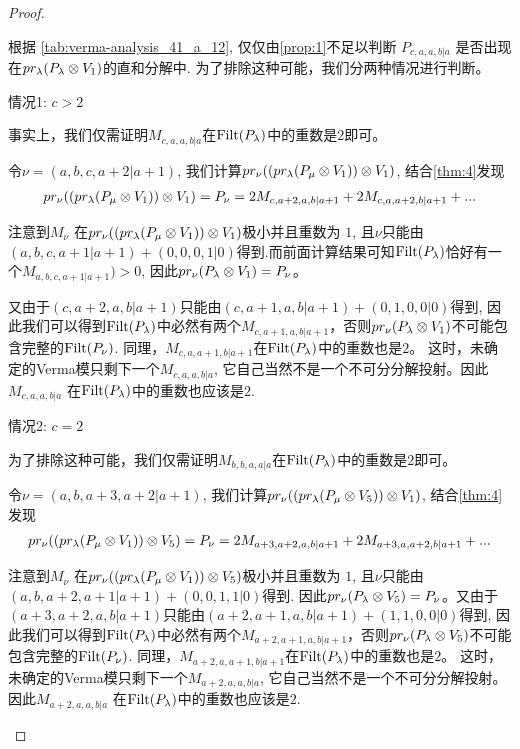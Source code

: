 \begin{proof}
\begin{enumerate}
\begin{enumerate}
\begin{enumerate}
根据 \cref{tab:verma-analysis_41_a_12}, 仅仅由\cref{prop:1}不足以判断 $P_{c,a,a,b|a}$ 是否出现在$pr_\lambda(P_\lambda \otimes V_{1})$的直和分解中. 为了排除这种可能，我们分两种情况进行判断。

情况1: $c>2$

事实上，我们仅需证明$M_{c,a,a,b|a}$在$\operatorname{Filt}(P_{\lambda})$中的重数是$2$即可。

令$\nu = (a,b,c,a+2|a+1)$, 我们计算$pr_\nu ( ( pr_\lambda(P_\mu \otimes V_{1}) ) \otimes V_1 )$, 结合\cref{thm:4}发现
\begin{equation}\notag
  \begin{aligned}
  pr_\nu ( ( pr_\lambda(P_\mu \otimes V_{1}) ) \otimes V_1 ) =
  P_\nu = 2M_{c,a+2,a,b|a+1} + 2M_{c,a,a+2,b|a+1} + ...
  \end{aligned}
\end{equation}

注意到$M_\nu$ 在$pr_\nu ( ( pr_\lambda(P_\mu \otimes V_{1}) ) \otimes V_1 )$极小并且重数为 $1$, 且$\nu$只能由$ (a,b,c,a+1|a+1) + (0,0,0,1|0)$得到.而前面计算结果可知$\operatorname{Filt}(P_\lambda)$恰好有一个$M_{a,b,c,a+1|a+1})>0$, 因此$pr_\nu(P_\lambda \otimes V_1) = P_\nu$。

又由于$(c,a+2,a,b|a+1)$只能由$(c,a+1,a,b|a+1) + (0,1,0,0|0)$得到, 因此我们可以得到$\operatorname{Filt}(P_{\lambda})$中必然有两个$M_{c,a+1,a,b|a+1}$，否则$pr_\nu(P_\lambda \otimes V_1)$不可能包含完整的$\operatorname{Filt}(P_\nu)$. 同理，$M_{c,a,a+1,b|a+1}$在$\operatorname{Filt}(P_{\lambda})$中的重数也是$2$。
这时，未确定的Verma模只剩下一个$M_{c,a,a,b|a}$, 它自己当然不是一个不可分分解投射。因此$M_{c,a,a,b|a}$ 在$\operatorname{Filt}(P_\lambda)$中的重数也应该是$2$.


情况2: $c=2$

为了排除这种可能，我们仅需证明$M_{b,b,a,a|a}$在$\operatorname{Filt}(P_{\lambda})$中的重数是$2$即可。

令$\nu = (a,b,a+3,a+2|a+1)$, 我们计算$pr_\nu ( ( pr_\lambda(P_\mu \otimes V_{5}) ) \otimes V_1 )$, 结合\cref{thm:4}发现
\begin{equation}\notag
  \begin{aligned}
  pr_\nu ( ( pr_\lambda(P_\mu \otimes V_{1}) ) \otimes V_5 ) =
  P_\nu = 2M_{a+3,a+2,a,b|a+1}+ 2M_{a+3,a,a+2,b|a+1}+...
  \end{aligned}
\end{equation}

注意到$M_\nu$ 在$pr_\nu ( ( pr_\lambda(P_\mu \otimes V_{1}) ) \otimes V_5 )$极小并且重数为 $1$, 且$\nu$只能由$ (a,b,a+2,a+1|a+1) + (0,0,1,1|0)$得到. 因此$pr_\nu(P_\lambda \otimes V_5) = P_\nu$。又由于$(a+3,a+2,a,b|a+1)$只能由$(a+2,a+1,a,b|a+1) + (1,1,0,0|0)$得到, 因此我们可以得到$\operatorname{Filt}(P_{\lambda})$中必然有两个$M_{a+2,a+1,a,b|a+1}$，否则$pr_\nu(P_\lambda \otimes V_5)$不可能包含完整的$\operatorname{Filt}(P_\nu)$.
同理，$M_{a+2,a,a+1,b|a+1}$在$\operatorname{Filt}(P_{\lambda})$中的重数也是$2$。
这时，未确定的Verma模只剩下一个$M_{a+2,a,a,b|a}$, 它自己当然不是一个不可分分解投射。因此$M_{a+2,a,a,b|a}$ 在$\operatorname{Filt}(P_\lambda)$中的重数也应该是$2$.



\end{enumerate}
\end{enumerate}
\end{enumerate}
\end{proof}
